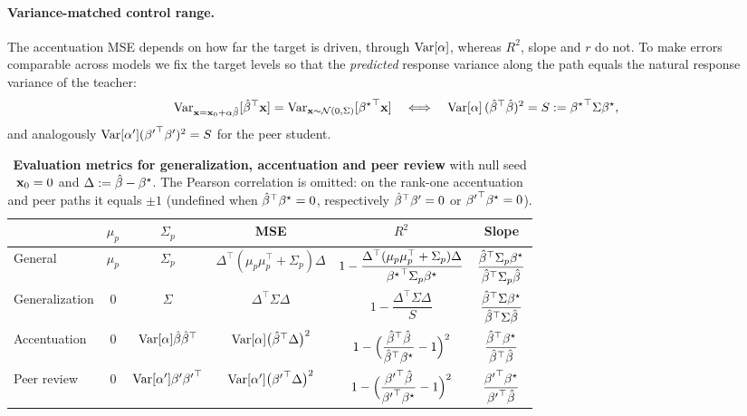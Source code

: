\paragraph{Variance-matched control range.}
The accentuation MSE depends on how far the target is driven, through
$\mathrm{Var}[\alpha]$, whereas $R^2$, slope and $r$ do not.  To make errors
comparable across models we fix the target levels so that the
\emph{predicted} response variance along the path equals the natural
response variance of the teacher:
\begin{equation}
\mathrm{Var}_{\mathbf{x}=\mathbf{x}_0+\alpha\hat{\beta}}[{\hat{\beta}}^\top\mathbf{x}]=\mathrm{Var}_{\mathbf{x}\sim\mathcal N(0,\Sigma)}[{{\beta^{\star}}}^\top\mathbf{x}]
\quad\Longleftrightarrow\quad
\mathrm{Var}[\alpha]\,({\hat{\beta}}^\top\hat{\beta})^2=S:={{\beta^{\star}}}^\top\Sigma{\beta^{\star}} ,
\label{eq:app-variance-matching}
\end{equation}
and analogously $\mathrm{Var}[\alpha']({{\beta^{\prime}}}^\top{\beta^{\prime}})^2=S$ for the peer student.

\begin{table}[t]
\centering\small
\begin{tabular}{@{}lccccc@{}}
\toprule
 & $\mu_p$ & $\Sigma_p$ & MSE & $R^2$ & Slope \\
\midrule
General & $\mu_p$ & $\Sigma_p$
 & $\Delta^\top(\mu_p\mu_p^\top+\Sigma_p)\Delta$
 & $1-\dfrac{\Delta^\top(\mu_p\mu_p^\top+\Sigma_p)\Delta}{{{\beta^{\star}}}^\top\Sigma_p{\beta^{\star}}}$
 & $\dfrac{{\hat{\beta}}^\top\Sigma_p{\beta^{\star}}}{{\hat{\beta}}^\top\Sigma_p\hat{\beta}}$ \\[1.2ex]
Generalization & $0$ & $\Sigma$
 & $\Delta^\top\Sigma\Delta$
 & $1-\dfrac{\Delta^\top\Sigma\Delta}{S}$
 & $\dfrac{{\hat{\beta}}^\top\Sigma{\beta^{\star}}}{{\hat{\beta}}^\top\Sigma\hat{\beta}}$ \\[1.2ex]
Accentuation & $0$ & $\mathrm{Var}[\alpha]\hat{\beta}{\hat{\beta}}^\top$
 & $\mathrm{Var}[\alpha]\big({\hat{\beta}}^\top\Delta\big)^2$
 & $1-\Big(\dfrac{{\hat{\beta}}^\top\hat{\beta}}{{\hat{\beta}}^\top{\beta^{\star}}}-1\Big)^2$
 & $\dfrac{{\hat{\beta}}^\top{\beta^{\star}}}{{\hat{\beta}}^\top\hat{\beta}}$ \\[1.2ex]
Peer review & $0$ & $\mathrm{Var}[\alpha']{\beta^{\prime}}{{\beta^{\prime}}}^\top$
 & $\mathrm{Var}[\alpha']\big({{\beta^{\prime}}}^\top\Delta\big)^2$
 & $1-\Big(\dfrac{{{\beta^{\prime}}}^\top\hat{\beta}}{{{\beta^{\prime}}}^\top{\beta^{\star}}}-1\Big)^2$
 & $\dfrac{{{\beta^{\prime}}}^\top{\beta^{\star}}}{{{\beta^{\prime}}}^\top\hat{\beta}}$ \\
\bottomrule
\end{tabular}
\caption{\textbf{Evaluation metrics for generalization, accentuation and
peer review} with null seed $\mathbf{x}_0=0$ and $\Delta:=\hat{\beta}-{\beta^{\star}}$.  The Pearson
correlation is omitted: on the rank-one accentuation and peer paths it equals
$\pm1$ (undefined when ${\hat{\beta}}^\top{\beta^{\star}}=0$, respectively
${\hat{\beta}}^\top{\beta^{\prime}}=0$ or ${{\beta^{\prime}}}^\top{\beta^{\star}}=0$).}
\label{tab:theory-Evaluation-metrics}
\end{table}

